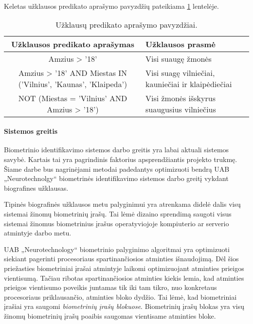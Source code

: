 Keletas užklausos predikato aprašymo pavyzdžių pateikiama \ref{tab:queryExamples} lentelėje.

\begin{table}[H]\footnotesize
	\centering
	\begin{tabular}{|c|l|}
		\hline
		{\bf Užklausos predikato aprašymas} & {\bf Užklausos prasmė} \\
		\hline
		Amzius > '18' & Visi suaugę žmonės\\
		\hline
		Amzius > '18' AND Miestas IN ('Vilnius', 'Kaunas', 'Klaipeda') & Visi suagę vilniečiai, kauniečiai ir klaipėdiečiai \\
		\hline
		NOT (Miestas = 'Vilnius' AND Amzius > '18') & Visi žmonės išskyrus suaugusius vilniečius \\
		\hline
	\end{tabular}
	\caption{Užklausų predikato aprašymo pavyzdžiai.}
	\label{tab:queryExamples}
\end{table}




\paragraph{Sistemos greitis}

Biometrinio identifikavimo sistemos darbo greitis yra labai aktuali sistemos savybė.
Kartais \cite{NeurotechnologyDRCDedublicationProject} \cite{NeurotechnologyVenezuelaDedublicationProject} tai yra pagrindinis faktorius apsprendžiantis projekto trukmę.
Šiame darbe bus nagrinėjami metodai padedantys optimizuoti bendrą UAB „Neurotechnolgy“ biometrinės identifikavimo sistemos \cite{NeurotechnologyMegamatcherAccelerator} darbo greitį vykdant biografines užklausas.

Tipinės biografinės užklausos metu palyginimui yra atrenkama didelė dalis visų sistemai žinomų biometrinių įrašų.
Tai lėmė dizaino sprendimą saugoti visus sistemai žinomus biometrinius įrašus operatyviojoje kompiuterio ar serverio atmintyje darbo metu.

UAB „Neurotechnology“ biometrinio palyginimo algoritmai yra optimizuoti siekiant pagerinti procesoriaus spartinančiosios atminties išnaudojimą.
Dėl šios priežasties biometriniai įrašai atmintyje laikomi optimizuojant atminties prieigos vientisumą.
Tačiau ribotas spartinančiosios atminties kiekis lemia, kad atminties prieigos vientisumo poveikis juntamas tik iki tam tikro, nuo konkretaus procesoriaus priklausančio, atminties bloko dydžio.
Tai lėmė, kad biometriniai įrašiai yra saugomi {\it biometrinių įrašų blokuose}.
Biometrinių įrašų blokas yra visų žinomų biometrinių įrašų poaibis saugomas vientisame atminties bloke.

